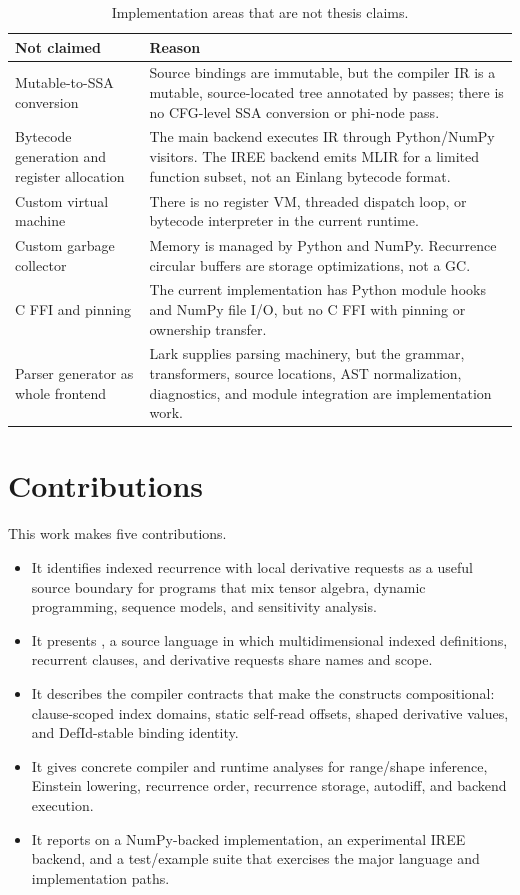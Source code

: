 \begin{table}[htbp]
\centering
\caption{Implementation areas that are not thesis claims.}
\label{tab:non-focus}
\renewcommand{\arraystretch}{1.08}
\begin{tabular}{@{}L{0.34\textwidth}L{0.54\textwidth}@{}}
\toprule
Not claimed & Reason \\
\midrule
Mutable-to-SSA conversion & Source bindings are immutable, but the compiler IR is a mutable, source-located tree annotated by passes; there is no CFG-level SSA conversion or phi-node pass. \\
Bytecode generation and register allocation & The main backend executes IR through Python/NumPy visitors. The IREE backend emits MLIR for a limited function subset, not an Einlang bytecode format. \\
Custom virtual machine & There is no register VM, threaded dispatch loop, or bytecode interpreter in the current runtime. \\
Custom garbage collector & Memory is managed by Python and NumPy. Recurrence circular buffers are storage optimizations, not a GC. \\
C FFI and pinning & The current implementation has Python module hooks and NumPy file I/O, but no C FFI with pinning or ownership transfer. \\
Parser generator as whole frontend & Lark supplies parsing machinery, but the grammar, transformers, source locations, AST normalization, diagnostics, and module integration are implementation work. \\
\bottomrule
\end{tabular}
\end{table}

\section{Contributions}

This work makes five contributions.
\begin{itemize}
\item It identifies indexed recurrence with local derivative requests as a useful
source boundary for programs that mix tensor algebra, dynamic programming,
sequence models, and sensitivity analysis.
\item It presents \einlang{}, a source language in which multidimensional
indexed definitions, recurrent clauses, and derivative requests share names and
scope.
\item It describes the compiler contracts that make the constructs
compositional: clause-scoped index domains, static self-read offsets, shaped
derivative values, and DefId-stable binding identity.
\item It gives concrete compiler and runtime analyses for range/shape
inference, Einstein lowering, recurrence order, recurrence storage, autodiff,
and backend execution.
\item It reports on a NumPy-backed implementation, an experimental IREE backend,
and a test/example suite that exercises the major language and implementation
paths.
\end{itemize}

